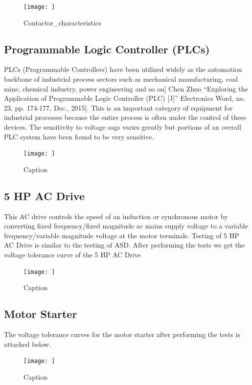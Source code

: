 \documentclass[17pt, a4paper]{extreport}
\begin{document}
\begin{enumerate}
 \begin{figure}
     \centering
     \texttt{[image: ]}
     \caption{Contactor_characteristics}
     \label{fig:contactor_characteristics}
 \end{figure}
 
 \subsection{Programmable Logic Controller (PLCs) } PLCs (Programmable Controllers) have been utilized widely as the automation backbone of industrial process sectors such as mechanical manufacturing, coal mine, chemical industry, power engineering and so on[ Chen Zhuo “Exploring the Application of Programmable Logic Controller (PLC) [J]” Electronics Word, no. 23, pp. 174-177, Dec., 2015]. This is an important category of equipment for industrial processes because the entire process is often under the control of these devices. The sensitivity to voltage sags varies greatly but portions of an overall PLC system have been found to be very sensitive. 
 
 \begin{figure}
     \centering
     \texttt{[image: ]}
     \caption{Caption}
     \label{fig:my_label}
 \end{figure}
 
 \subsection{5 HP AC Drive} This AC drive controls the speed of an induction or synchronous motor by converting fixed frequency/fixed magnitude ac mains supply voltage to a variable frequency/variable magnitude voltage at the motor terminals. Testing of 5 HP AC Drive is similar to the testing of ASD. After performing the tests we get the voltage tolerance curve of the 5 HP AC Drive
 \begin{figure}
     \centering
     \texttt{[image: ]}
     \caption{Caption}
     \label{fig:my_label}
 \end{figure}
 \subsection{Motor Starter}The voltage tolerance curves for the motor starter after performing the tests is attached below.
 \begin{figure}
     \centering
     \texttt{[image: ]}
     \caption{Caption}
     \label{fig:my_label}
 \end{figure}

\end{enumerate}
\end{document}
